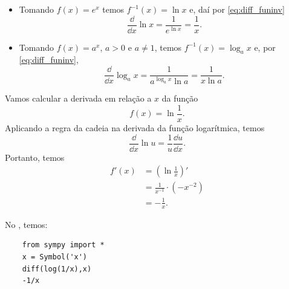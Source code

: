 \begin{obs}
  \begin{itemize}
  \item Tomando $f(x) = e^x$ temos $f^{-1}(x) = \ln x$ e, daí por \eqref{eq:diff_funinv}
    \begin{equation}
      \frac{\dd }{\dd x}\ln x = \frac{1}{e^{\ln x}} = \frac{1}{x}.
    \end{equation}
  \item Tomando $f(x) = a^x$, $a> 0$ e $a\neq 1$, temos $f^{-1}(x) = \log_a x$ e, por \eqref{eq:diff_funinv},
    \begin{equation}
      \frac{\dd}{\dd x}\log_a x = \frac{1}{a^{\log_a x}\ln a} = \frac{1}{x\ln a}.
    \end{equation}
  \end{itemize}
\end{obs}

\begin{ex}
  Vamos calcular a derivada em relação a $x$ da função
  \begin{equation}
    f(x) = \ln \frac{1}{x}.
  \end{equation}
  Aplicando a regra da cadeia na derivada da função logarítmica, temos
  \begin{equation}
    \frac{\dd}{\dd x}\ln u = \frac{1}{u}\frac{\dd u}{\dd x}.
  \end{equation}
  Portanto, temos
  \begin{align}
    f'(x) &= \left(\ln\frac{1}{x}\right)'\\
          &= \frac{1}{x^{-1}}\cdot (-x^{-2}) \\
          &= -\frac{1}{x}.
  \end{align}

  \ifispython
  No \sympy, temos:
  \begin{lstlisting}
    from sympy import *
    x = Symbol('x')
    diff(log(1/x),x)
    -1/x
  \end{lstlisting}
  \fi  
\end{ex}


